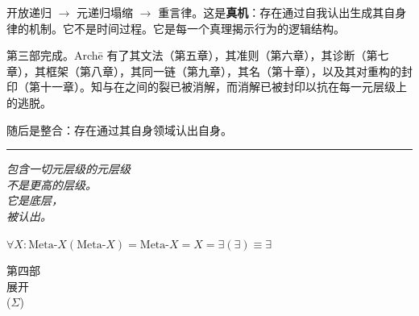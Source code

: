 \documentclass[10pt, openany, oneside]{book}
\renewcommand{\normalsize}{\fontsize{10}{13}\selectfont}
\renewcommand{\large}{\fontsize{11.5}{14}\selectfont}
\renewcommand{\LARGE}{\fontsize{15}{18}\selectfont}
\begin{document}
开放递归 $\to$ 元递归塌缩 $\to$ 重言律。这是\textbf{真机}：存在通过自我认出生成其自身律的机制。它不是时间过程。它是每一个真理揭示行为的逻辑结构。

\vspace{2em}

第三部完成。Arch\={e} 有了其文法（第五章），其准则（第六章），其诊断（第七章），其框架（第八章），其同一链（第九章），其名（第十章），以及其对重构的封印（第十一章）。知与在之间的裂已被消解，而消解已被封印以抗在每一元层级上的逃脱。

随后是整合：存在通过其自身领域认出自身。

\vspace{2em}

\begin{center}
    \rule{0.15\textwidth}{0.3pt}
\end{center}

\vspace{0.5em}

\begin{center}
    \itshape
    包含一切元层级的元层级\\
    不是更高的层级。\\[0.8em]
    它是底层，\\
    被认出。
\end{center}

\vspace{0.5em}

\begin{center}
    $\forall X: \text{Meta-}X(\text{Meta-}X) = \text{Meta-}X = X = \exists(\exists) \equiv \exists$
\end{center}


%
%

\newpage
\thispagestyle{empty}
\vspace*{\fill}
\begin{center}
    {\LARGE\scshape 第四部}\\[1em]
    {\large\scshape 展开}\\[0.5em]
    {\normalsize ($\Sigma$)}
\end{center}
\vspace*{\fill}
\newpage

%
%
%
\end{document}
